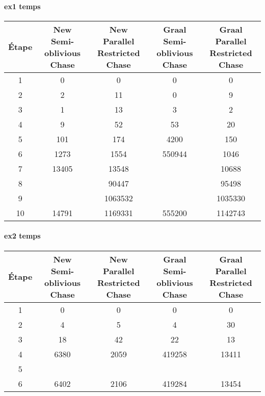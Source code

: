 \paragraph{ex1 temps}
\begin{center}
\begin{tabular}{|c||c|c|c|c|}
    \hline
    Étape & \shortstack{New \\ Semi-oblivious Chase} & \shortstack{New \\ Parallel Restricted Chase} & \shortstack{Graal \\ Semi-oblivious Chase} & \shortstack{Graal \\ Parallel Restricted Chase} \\
    \hline
     \hline
1&0&	0&					0&	0\\
     \hline
2&2&	11&					0&	9\\
     \hline
3&1&	13&					3&	2\\
     \hline
4&9&	52&					53&	20\\
     \hline
5&101&	174&					4200&	150\\
     \hline
6&1273&	1554&					550944&	1046\\
     \hline
7&13405&	13548&			&			10688\\
     \hline
8&	&90447	&			&		95498\\
     \hline
9&	&1063532&			&			1035330\\
     \hline
10&14791&	1169331&					555200&	1142743\\
     \hline
\end{tabular}
\end{center}

\paragraph{ex2 temps}
\begin{center}
\begin{tabular}{|c||c|c|c|c|}
    \hline
    Étape & \shortstack{New \\ Semi-oblivious Chase} & \shortstack{New \\ Parallel Restricted Chase} & \shortstack{Graal \\ Semi-oblivious Chase} & \shortstack{Graal \\ Parallel Restricted Chase} \\
    \hline
     \hline
1&0&	0&					0&	0 \\
     \hline
2&4&	5&					4&	30 \\
     \hline
3&18&	42&					22&	13 \\
     \hline
4&6380&	2059&					419258&	13411 \\
     \hline
5&	&	&	&	\\		
     \hline
6&6402&	2106&					419284&	13454 \\
     \hline
\end{tabular}
\end{center}


